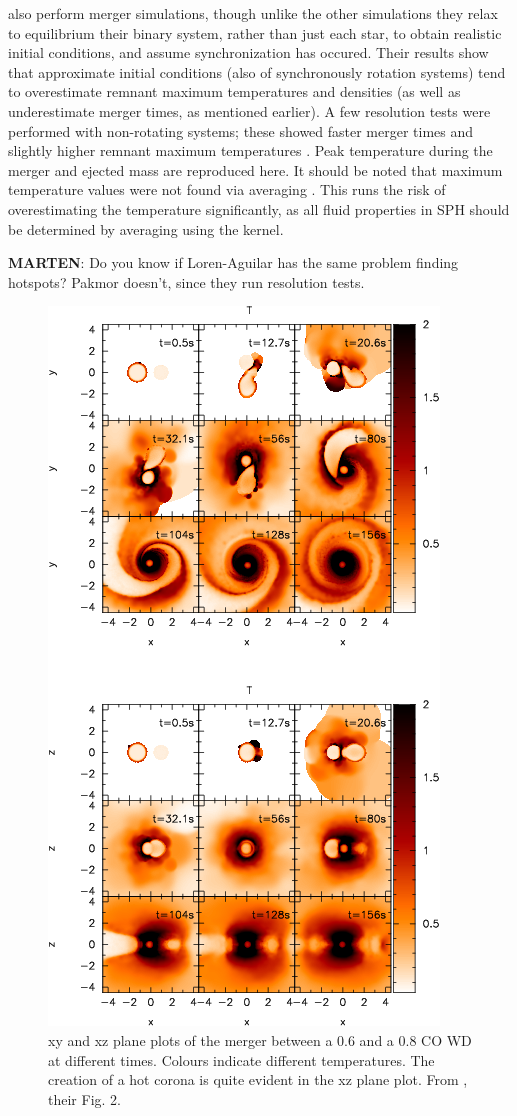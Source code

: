 \cite{dan+11} also perform merger simulations, though unlike the other simulations they relax to equilibrium their binary system, rather than just each star, to obtain realistic initial conditions, and assume synchronization has occured.  Their results show that approximate initial conditions (also of synchronously rotation systems) tend to overestimate remnant maximum temperatures and densities (as well as underestimate merger times, as mentioned earlier).  A few resolution tests were performed with non-rotating systems; these showed faster merger times and slightly higher remnant maximum temperatures \citep{danpc11}.  Peak temperature during the merger and ejected mass are reproduced here.  It should be noted that maximum temperature values were not found via averaging \citep{danpc11}.  This runs the risk of overestimating the temperature significantly, as all fluid properties in SPH should be determined by averaging using the kernel.

\textbf{MARTEN}: Do you know if Loren-Aguilar has the same problem finding hotspots?  Pakmor doesn't, since they run resolution tests.

\begin{figure}
\centerline{\includegraphics[width=0.6\hsize]{mergerfig.png}}
\caption{xy and xz plane plots of the merger between a 0.6 and a 0.8 {\Msun} CO WD at different times.  Colours indicate different temperatures.  The creation of a hot corona is quite evident in the xz plane plot.  From \cite{loreig09}, their Fig. 2.}
\label{mergerfig}
\end{figure}

